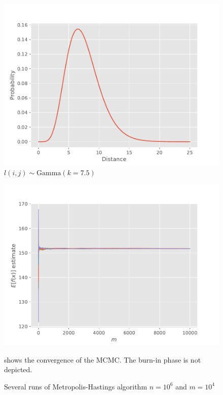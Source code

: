 \documentclass[6pt,oneside]{article}
\begin{document}
\begin{figure}[h]
    \center
    \caption{$l(i,j) \sim \mathrm{Gamma}(k=7.5)$}
    \includegraphics[scale=0.8]{../src/fig1.pdf}
\end{figure}


\begin{figure}[h]
    \center
    \caption{Several runs of Metropolis-Hastings algorithm $n=10^{6}$ and $m=10^{4}$}
    \label{fig:conv}
    \includegraphics[scale=0.8]{../src/fig2.pdf}
    \footnotesize
    \vspace{10pt}

     shows the convergence of the MCMC. The burn-in phase is not depicted.
\end{figure}
\end{document}
